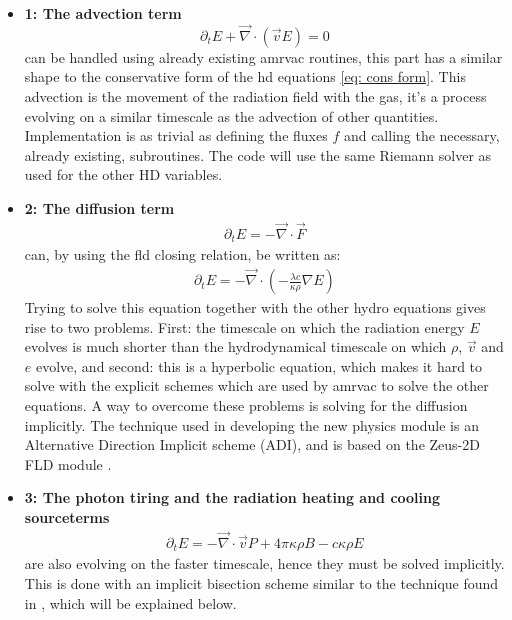 \begin{itemize}
\item \textbf{1: The advection term}
\begin{equation}
\partial_t E + \vec{\nabla} \cdot \left( \vec{v} E \right) = 0
\end{equation}
can be handled using already existing amrvac routines, this part has a similar shape to the conservative form of the hd equations \eqref{eq: cons form}. This advection is the movement of the radiation field with the gas, it's a process evolving on a similar timescale as the advection of other quantities. Implementation is as trivial as defining the fluxes $f$ and calling the necessary, already existing, subroutines. The code will use the same Riemann solver as used for the other HD variables.\\

\item \textbf{2: The diffusion term}
\begin{align}
\partial_t E = - \vec{\nabla} \cdot \vec{F}
\end{align}
can, by using the fld closing relation, be written as:
\begin{align}
\partial_t E = - \vec{\nabla} \cdot \left( -\frac{\lambda c}{\kappa \rho} \nabla E\right)
\end{align}
Trying to solve this equation together with the other hydro equations gives rise to two problems. First: the timescale on which the radiation energy $E$ evolves is much shorter than the hydrodynamical timescale on which $\rho$, $\vec{v}$ and $e$ evolve, and second: this is a hyperbolic equation, which makes it hard to solve with the explicit schemes which are used by amrvac to solve the other equations. A way to overcome these problems is solving for the diffusion implicitly. The technique used in developing the new physics module is an Alternative Direction Implicit scheme (ADI), and is based on the Zeus-2D FLD module \cite{Turener12001}.\\

\item \textbf{3: The photon tiring and the radiation heating and cooling sourceterms}
\begin{align}
\partial_t E = - \vec{\nabla} \cdot \vec{v} P + 4\pi \kappa\rho B - c \kappa \rho E
\end{align}
are also evolving on the faster timescale, hence they must be solved implicitly. This is done with an implicit bisection scheme similar to the technique found in \cite{Turner12001}, which will be explained below.
\end{itemize}

